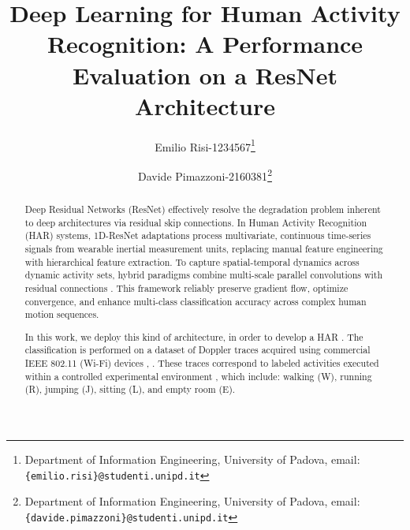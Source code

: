 \documentclass[10pt, conference, letterpaper]{IEEEtran}
\title{Deep Learning for Human Activity Recognition: A Performance Evaluation on a ResNet Architecture}
\author{
  Emilio Risi-1234567\thanks{Department of Information Engineering, University of Padova, \newline email: \texttt{\{emilio.risi\}@studenti.unipd.it}}
  \and
  Davide Pimazzoni-2160381\thanks{Department of Information Engineering, University of Padova, \newline email: \texttt{\{davide.pimazzoni\}@studenti.unipd.it}}
}
\begin{document}
\maketitle

\begin{abstract}

Deep Residual Networks (ResNet) \cite{He-2015} effectively resolve the degradation problem inherent to deep architectures via residual skip connections. In Human Activity Recognition (HAR) systems, 1D-ResNet adaptations \cite{MDPI2025} process multivariate, continuous time-series signals from wearable inertial measurement units, replacing manual feature engineering with hierarchical feature extraction. To capture spatial-temporal dynamics across dynamic activity sets, hybrid paradigms combine multi-scale parallel convolutions with residual connections \cite{IEEE2021}. This framework reliably preserve gradient flow, optimize convergence, and enhance multi-class classification accuracy across complex human motion sequences.

In this work, we deploy this kind of architecture, in order to develop a HAR . The classification is performed on a dataset of Doppler traces acquired using commercial IEEE 802.11 (Wi-Fi) devices \cite{MeneghelloNN-2023}, \cite{MeneghelloDataset-2023}. These traces correspond to labeled activities executed within a controlled experimental environment \cite{MeneghelloDataset-2023}, which include: walking (W), running (R), jumping (J), sitting (L), and empty room (E).


\end{abstract}
\end{document}
